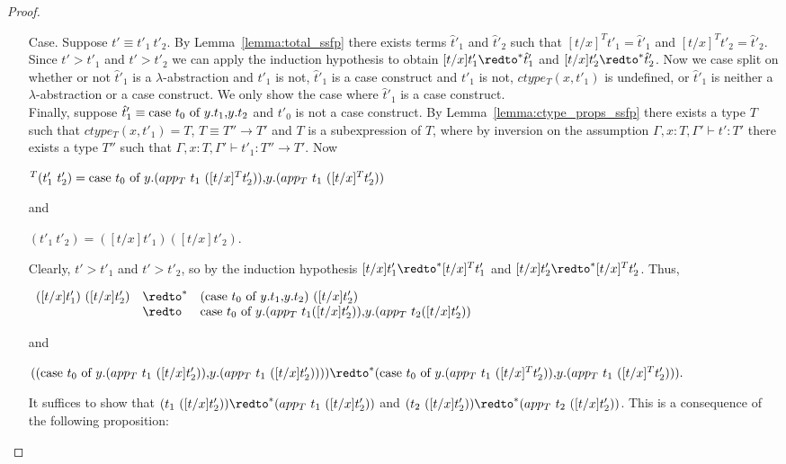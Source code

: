 \begin{proof}
\begin{itemize}
  \item[Case.] Suppose $t' \equiv t'_1\ t'_2$.  By Lemma~\ref{lemma:total_ssfp}
    there exists terms $\hat{t}'_1$ and $\hat{t}'_2$
    such that $[t/x]^T t'_1 = \hat{t}'_1$ and $[t/x]^T t'_2 = \hat{t}'_2$.  Since
    $t' > t'_1$ and $t' > t'_2$ we can apply the induction hypothesis to obtain
    $[t/x]t'_1 \redto^* \hat{t}'_1$ and $[t/x]t'_2 \redto^* \hat{t}'_2$.  Now we case
    split on whether or not $\hat{t}'_1$ is a $\lambda$-abstraction and $t'_1$ is not, $\hat{t}'_1$ is a case construct and
    $t'_1$ is not, $ctype_T(x,t'_1)$ is undefined, or $\hat{t}'_1$ is neither a $\lambda$-abstraction or a case construct.  
    We only show the case where $\hat{t}'_1$ is a case construct.
    \ \\
    Finally, suppose $\hat{t}'_1 \equiv \mbox{case}\ t_0\ \text{of}\ y\text{.}t_1\text{,}y\text{.}t_2$ and $t'_0$ is not a case construct.  By Lemma~\ref{lemma:ctype_props_ssfp}
    there exists a type $T$ such that $ctype_T(x,t'_1) = T$, $T \equiv T'' \to T'$ and $T$ is a subexpression
    of $T$, where by inversion on the assumption $\Gamma,x:T,\Gamma' \vdash t':T'$ there exists a type $T''$ such that
    $\Gamma,x:T,\Gamma' \vdash t'_1:T'' \to T'$.  Now 
    \begin{center}
      \begin{math}
        [t/x]^T (t'_1\ t'_2) = \ccon{t_0}{y}{(app_T\ t_1\ ([t/x]^T t'_2))}{(app_T\ t_1\ ([t/x]^T t'_2))}
      \end{math}
    \end{center}
    and
    \begin{center}
      \begin{math}
        [t/x](t'_1\ t'_2) = ([t/x]t'_1)([t/x]t'_2).
      \end{math}
    \end{center}
    Clearly, $t' > t'_1$ and $t' > t'_2$, so by the induction hypothesis $[t/x]t'_1 \redto^* [t/x]^T t'_1$ and $[t/x]t'_2 \redto^* [t/x]^T t'_2$.  Thus,
    \begin{center}
      \begin{math}
        \begin{array}{lll}
          ([t/x]t'_1)\ ([t/x]t'_2) & \redto^* & (\ccon{t_0}{y}{t_1}{t_2})\ ([t/x]t'_2)\\
          & \redto & \ccon{t_0}{y}{(app_T\ t_1 ([t/x]t'_2))}{(app_T\ t_2 ([t/x]t'_2))}
        \end{array}
      \end{math}
    \end{center}
    and
    \begin{center}
      \begin{math}
        ((\ccon{t_0}{y}{(app_T\ t_1\ ([t/x] t'_2))}{(app_T\ t_1\ ([t/x] t'_2))})) \redto^* (\ccon{t_0}{y}{(app_T\ t_1\ ([t/x]^T t'_2))}{(app_T\ t_1\ ([t/x]^T t'_2))}).
      \end{math}
    \end{center}
    It suffices to show that $(t_1\ ([t/x] t'_2)) \redto^* (app_T\ t_1\ ([t/x] t'_2))$ and 
    $(t_2\ ([t/x] t'_2)) \redto^* (app_T\ t_2\ ([t/x] t'_2))$.  This is a consequence of the following proposition:
    

\end{itemize}
\end{proof}

